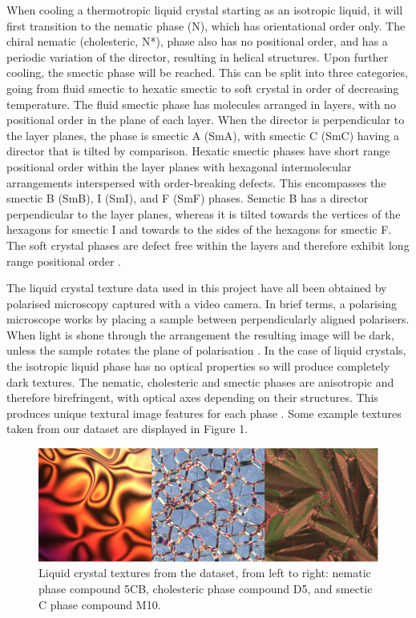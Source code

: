 \documentclass[12pt]{article}
\begin{document}
When cooling a thermotropic liquid crystal starting as an isotropic liquid, it will first transition to the nematic phase (N), which has orientational order only. The chiral nematic (cholesteric, N*), phase also has no positional order, and has a periodic variation of the director, resulting in helical structures. Upon further cooling, the smectic phase will be reached. This can be split into three categories, going from fluid smectic to hexatic smectic to soft crystal in order of decreasing temperature. The fluid smectic phase has molecules arranged in layers, with no positional order in the plane of each layer. When the director is perpendicular to the layer planes, the phase is smectic A (SmA), with smectic C (SmC) having a director that is tilted by comparison. Hexatic smectic phases have short range positional order within the layer planes with hexagonal intermolecular arrangements interspersed with order-breaking defects. This encompasses the smectic B (SmB), I (SmI), and F (SmF) phases. Semctic B has a director perpendicular to the layer planes, whereas it is tilted towards the vertices of the hexagons for smectic I and towards to the sides of the hexagons for smectic F. The soft crystal phases are defect free within the layers and therefore exhibit long range positional order \cite{Dierking03}.

The liquid crystal texture data used in this project have all been obtained by polarised microscopy captured with a video camera. In brief terms, a polarising microscope works by placing a sample between perpendicularly aligned polarisers. When light is shone through the arrangement the resulting image will be dark, unless the sample rotates the plane of polarisation \cite{Dierking03}. In the case of liquid crystals, the isotropic liquid phase has no optical properties so will produce completely dark textures. The nematic, cholesteric and smectic phases are anisotropic and therefore birefringent, with optical axes depending on their structures. This produces unique textural image features for each phase \cite{Dierking03}. Some example textures taken from our dataset are displayed in Figure 1.

\begin{figure}[h]
\centering
\includegraphics[width=6in]{images/texture_samples.png}
\caption{Liquid crystal textures from the dataset, from left to right: nematic phase compound 5CB, cholesteric phase compound D5, and smectic C phase compound M10.}
\end{figure}
\end{document}
